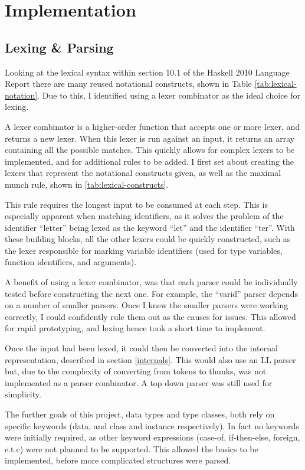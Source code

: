 \section{Implementation} \label{implementation}

\subsection{Lexing \& Parsing}
\label{syntax}
Looking at the lexical syntax within section 10.1 of the Haskell 2010 Language Report\cite{haskell2010} there are many reused notational constructs, shown in Table \ref{tab:lexical-notation}. Due to this, I identified using a lexer combinator as the ideal choice for lexing.

A lexer combinator is a higher-order function that accepts one or more lexer, and returns a new lexer. When this lexer is run against an input, it returns an array containing all the possible matches. This quickly allows for complex lexers to be implemented, and for additional rules to be added.
I first set about creating the lexers that represent the notational constructs given, as well as the maximal munch rule, shown in \ref{tab:lexical-constructs}.

This rule requires the longest input to be consumed at each step. This is especially apparent when matching identifiers, as it solves the problem of the identifier ``letter'' being lexed as the keyword ``let'' and the identifier ``ter''.
With these building blocks, all the other lexers could be quickly constructed, such as the lexer responsible for marking variable identifiers (used for type variables, function identifiers, and arguments).

A benefit of using a lexer combinator, was that each parser could be individually tested before constructing the next one. For example, the ``varid'' parser depends on a number of smaller parsers. Once I knew the smaller parsers were working correctly, I could confidently rule them out as the causes for issues. This allowed for rapid prototyping, and lexing hence took a short time to implement.

Once the input had been lexed, it could then be converted into the internal representation, described in section \ref{internals}. This would also use an LL parser but, due to the complexity of converting from tokens to thunks, was not implemented as a parser combinator. A top down parser was still used for simplicity.

The further goals of this project, data types and type classes, both rely on specific keywords (data, and class and instance respectively). In fact no keywords were initially required, as other keyword expressions (case-of, if-then-else, foreign, e.t.c) were not planned to be supported. This allowed the basics to be implemented, before more complicated structures were parsed.

